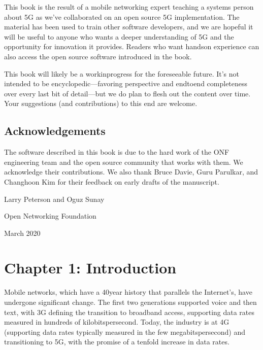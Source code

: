 \documentclass[a4paper,11pt,english]{sphinxmanual}
\begin{document}
\sphinxAtStartPar
This book is the result of a mobile networking expert teaching a
systems person about 5G as we’ve collaborated on an open source 5G
implementation. The material has been used to train other software
developers, and we are hopeful it will be useful to anyone who wants a
deeper understanding of 5G and the opportunity for innovation it
provides. Readers who want hands\sphinxhyphen{}on experience can also access the open
source software introduced in the book.

\sphinxAtStartPar
This book will likely be a work\sphinxhyphen{}in\sphinxhyphen{}progress for the foreseeable future.
It’s not intended to be encyclopedic—favoring perspective and end\sphinxhyphen{}to\sphinxhyphen{}end
completeness over every last bit of detail—but we do plan to flesh out
the content over time. Your suggestions (and contributions) to this end
are welcome.


\section*{Acknowledgements}
\label{\detokenize{preface:acknowledgements}}
\sphinxAtStartPar
The software described in this book is due to the hard work of the ONF
engineering team and the open source community that works with
them. We acknowledge their contributions. We also thank Bruce Davie,
Guru Parulkar, and Changhoon Kim for their feedback on early drafts of
the manuscript.

\begin{DUlineblock}{0em}
\item[] Larry Peterson and Oguz Sunay
\item[] Open Networking Foundation
\item[] March 2020
\end{DUlineblock}


\chapter{Chapter 1:  Introduction}
\label{\detokenize{intro:chapter-1-introduction}}\label{\detokenize{intro::doc}}
\sphinxAtStartPar
Mobile networks, which have a 40\sphinxhyphen{}year history that parallels the
Internet’s, have undergone significant change. The first two
generations supported voice and then text, with 3G defining the
transition to broadband access, supporting data rates measured in
hundreds of kilobits\sphinxhyphen{}per\sphinxhyphen{}second. Today, the industry is at 4G
(supporting data rates typically measured in the few
megabits\sphinxhyphen{}per\sphinxhyphen{}second) and transitioning to 5G, with the promise of a
tenfold increase in data rates.
\end{document}
